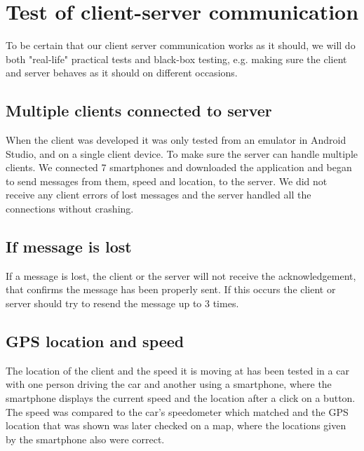 \section{Test of client-server communication}
To be certain that our client server communication works as it should, we will do both "real-life" practical tests and black-box testing, e.g. making sure the client and server behaves as it should on different occasions.

\subsection{Multiple clients connected to server}
When the client was developed it was only tested from an emulator in Android Studio, and on a single client device. To make sure the server can handle multiple clients. We connected 7 smartphones and downloaded the application and began to send messages from them, speed and location, to the server. We did not receive any client errors of lost messages and the server handled all the connections without crashing.

\subsection{If message is lost}
If a message is lost, the client or the server will not receive the acknowledgement, that confirms the message has been properly sent. If this occurs the client or server should try to resend the message up to 3 times.

\subsection{GPS location and speed}
The location of the client and the speed it is moving at has been tested in a car with one person driving the car and another using a smartphone, where the smartphone displays the current speed and the location after a click on a button. The speed was compared to the car's speedometer which matched and the GPS location that was shown was later checked on a map, where the locations given by the smartphone also were correct.

